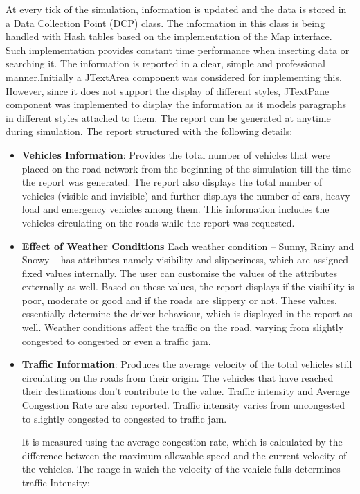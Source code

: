 \documentclass[11pt,a4paper]{article}
\begin{document}
  At every tick of the simulation, information is updated and the data
  is stored in a Data Collection Point (DCP) class. The information in
  this class is being handled with Hash tables based on the
  implementation of the Map interface. Such implementation provides
  constant time performance when inserting data or searching it.
  The information is reported in a clear, simple and professional
  manner.Initially a JTextArea component was considered for implementing this.
  However, since it does not support the display of different styles,
  JTextPane component was implemented to display the information as it
  models paragraphs in different styles attached to them.
  The report can be generated at anytime during simulation. The report structured with the following details:
  \begin{itemize}
  	\item \textbf{Vehicles Information}: Provides the total number of vehicles that were placed on the road network from the beginning of the simulation till the time the report was generated. The report also displays the total number of vehicles (visible and invisible) and further displays the number of cars, heavy load and emergency vehicles among them. This information includes the vehicles circulating on the roads while the report was requested.
  	\item \textbf{Effect of Weather Conditions}	Each weather condition – Sunny, Rainy and Snowy – has attributes namely visibility and slipperiness, which are assigned fixed values internally. The user can customise the values of the attributes externally as well. Based on these values, the report displays if the visibility is poor, moderate or good and if the roads are slippery or not. These values, essentially determine the driver behaviour, which is displayed in the report as well. Weather conditions affect the traffic on the road, varying from slightly congested to congested or even a traffic jam.
  	\item \textbf{Traffic Information}:	Produces the average velocity of the total vehicles still circulating on the roads from their origin. The vehicles that have reached their destinations don’t contribute to the value. Traffic intensity and Average Congestion Rate are also reported. Traffic intensity varies from uncongested to slightly congested to congested to traffic jam. 
		
  		It is measured using the average congestion rate, which is
  		calculated by the difference between the maximum allowable
  		speed and the current velocity of the vehicles. The range in
  		which the velocity of the vehicle falls determines traffic
  		Intensity:
  		

\end{itemize}
\end{document}
